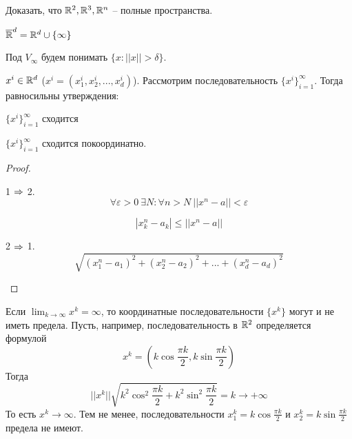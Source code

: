     \begin{Ex}
        Доказать, что $\mathbb{R}^2, \mathbb{R}^3, \mathbb{R}^n$ -- полные пространства.
    \end{Ex}

    \begin{notation}
        $\overline{\mathbb{R}}^d = \mathbb{R}^d \cup \{\infty\}$ 
    \end{notation}

    \begin{Rem}
        Под $V_\infty$ будем понимать $\{x : ||x|| > \delta\}$. 
    \end{Rem}    
    
    \begin{Thm} \label{thm:convergence}
        $x^i \in \mathbb{R}^d$ ($x^i = (x_1^i, x_2^i, ..., x_d^i)$). Рассмотрим последовательность $\{x^i\}_{i = 1}^\infty$. Тогда 
        равносильны утверждения: 

        \begin{MyList}
            \item $\{x^i\}_{i = 1}^\infty$ сходится
            \item $\{x^i\}_{i = 1}^\infty$ сходится покоординатно.  
        \end{MyList}
    \end{Thm}

    \begin{proof}
        \begin{MyList}
            \item[] 1 $\Rightarrow$ 2.
            \[\forall \varepsilon > 0 \ \exists N : \forall n > N \ ||x^n - a|| < \varepsilon\]

            \[|x_k^n - a_k| \leqslant ||x^n - a||\]

            \item[] 2 $\Rightarrow$ 1. 
            \[\sqrt{(x_1^n - a_1)^2 + (x_2^n - a_2)^2 + ... + (x_d^n - a_d)^2}\]
        \end{MyList}
    \end{proof}

    \begin{Rem}
        Если $\lim_{k \to \infty} x^k = \infty$, то координатные последовательности $\{x^k\}$ могут и не иметь предела. Пусть, например, последовательность в $\mathbb{R}^2$ определяется формулой 
        \[x^k = \left(k \cos \frac{\pi k}{2}, k \sin \frac{\pi k}{2}\right)\]
        Тогда 
        \[||x^k|| \sqrt{k^2 \cos^2 \frac{\pi k}{2} + k^2 \sin^2 \frac{\pi k}{2}} = k \to +\infty\]
        То есть $x^k \to \infty$. Тем не менее, последовательности $x_1^k = k \cos \frac{\pi k}{2}$ и $x_2^k = k \sin \frac{\pi k}{2}$ предела не имеют. 
    \end{Rem}

